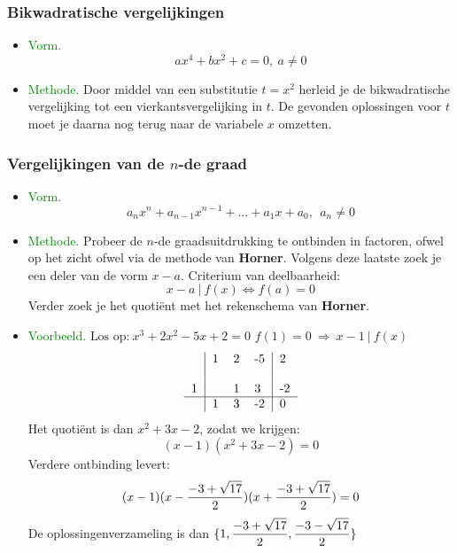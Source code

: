 \subsubsection{Bikwadratische vergelijkingen} \label{bikwadratische_vergelijkingen}
\hypertarget{bikwadratische_vergelijkingen}{}
		\begin{itemize}%
		\item \textcolor{green}{Vorm.}
		\[ax^4+bx^2+c=0,\: a\neq 0\]
		\item \textcolor{green}{Methode.}\newline
		Door middel van een substitutie $t=x^2$ herleid je de bikwadratische vergelijking 		tot een vierkantsvergelijking in $t$. De gevonden oplossingen voor $t$ moet je 		daarna nog terug naar de variabele $x$ omzetten.
		\end{itemize}%

\subsubsection{Vergelijkingen van de $n$-de graad} \label{n-de_graadsvergelijkingen}
\hypertarget{n-de_graadsvergelijkingen}{}
		\begin{itemize}%
		\item \textcolor{green}{Vorm.}
		\[a_nx^n+a_{n-1}x^{n-1}+\ldots +a_1x+a_0,\:\:a_n\neq 0\]
		\item \textcolor{green}{Methode.}\newline
		Probeer de $n$-de graadsuitdrukking te ontbinden in factoren, ofwel op het zicht ofwel via de methode van \hypertarget{horner}{{\bf Horner}}.\label{Horner}
		Volgens deze laatste zoek je een deler van de vorm $x-a$.
		\newline
		Criterium van deelbaarheid:
		\[x-a\: | \: f(x) \Leftrightarrow f(a)=0\]\newline
		Verder zoek je het quoti\"ent met het rekenschema van	{\bf 		Horner}.\newline\newline\newline
		\item \textcolor{green}{Voorbeeld.}\newline
		$\mbox{Los op:}\: x^3+2x^2-5x+2=0$\newline
		$f(1)=0 \: \Rightarrow\:  x-1 \: |\: f(x)$
		\[\begin{tabular}{l|lll|l}
		 & 1 & 2 & -5 & 2\\
		 &   &   &    &  \\
		1&   & 1 & 3  & -2\\
		\hline
		 & 1 & 3 & -2 & 0\\
		\end{tabular}\]
		Het quoti\"ent is dan $x^2+3x-2$, zodat we krijgen:
		\[(x-1)(x^2+3x-2)=0\]
		Verdere ontbinding levert:
		\[(x-1)(x-\displaystyle\frac{\displaystyle -3+\sqrt{17}}{\displaystyle 2})(x+\displaystyle\frac{\displaystyle -		3+\sqrt{17}}{\displaystyle 2})=0\]\newline
		De oplossingenverzameling is dan $\{1,\displaystyle\frac{\displaystyle -		3+\sqrt{17}}{\displaystyle 2},\displaystyle\frac{\displaystyle -3-\sqrt{17}}{\displaystyle 2} \}$\vskip 2cm
		\end{itemize}%

